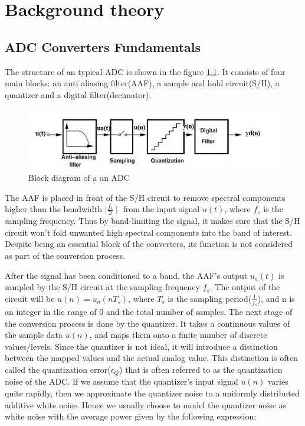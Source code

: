 \chapter{Background theory}

\section{ADC Converters Fundamentals }\label{fundamentals}

The structure of an typical ADC is shown in the figure \ref{fig:adc_block}. It consists of four main blocks: an anti aliasing filter(AAF), a sample and hold circuit(S/H), a quantizer and a digital filter(decimator).
\begin{figure}[h]
\centering
\includegraphics[scale=0.9]{images/adc_block.png}
\caption{Block diagram of a an ADC}
\label{fig:adc_block}
\end{figure}

The AAF is placed in front of the S/H circuit to remove spectral components higher than the bandwidth $\mid\frac{f_s}{2}\mid$ from the input signal $u(t)$, where $f_s$ is the sampling frequency. Thus by band-limiting the signal, it makes sure that the S/H circuit won't fold unwanted high spectral components into the band of interest. Despite being an essential block of the converters, its function is not considered as part of the conversion process.

After the signal has been conditioned to a band, the AAF's output $u_a(t)$ is sampled by the S/H circuit at the sampling frequency $f_s$. The output of the circuit will be $u(n) = u_a(nT_s)$, where $T_s$ is the sampling period($\frac{1}{f_s}$), and n is an integer in the range of 0 and the total number of samples. The next stage of the conversion process is done by the quantizer. It takes a continuous values of the sample data $u(n)$, and maps them onto a finite number of discrete values/levels. Since the quantizer is not ideal, it will introduce a distinction between the mapped values and the actual analog value. This distinction is often called the quantization error($\epsilon_Q$) that is often referred to as the quantization noise of the ADC. If we assume that the quantizer's input signal $u(n)$ varies quite rapidly, then we approximate the quantizer noise to a uniformly distributed additive white noise. Hence we usually choose to model the quantizer noise as white noise with the average power given by the following expression: 

